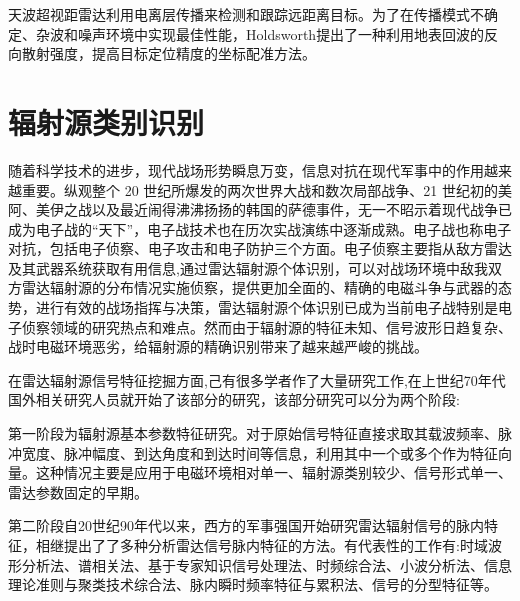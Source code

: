 天波超视距雷达利用电离层传播来检测和跟踪远距离目标。为了在传播模式不确定、杂波和噪声环境中实现最佳性能，Holdsworth\cite{holdsworth2017skywave}提出了一种利用地表回波的反向散射强度，提高目标定位精度的坐标配准方法。
\section{辐射源类别识别}
随着科学技术的进步，现代战场形势瞬息万变，信息对抗在现代军事中的作用越来越重要。纵观整个 20 世纪所爆发的两次世界大战和数次局部战争、21 世纪初的美阿、美伊之战以及最近闹得沸沸扬扬的韩国的萨德事件，无一不昭示着现代战争已成为电子战的“天下”，电子战技术也在历次实战演练中逐渐成熟。电子战也称电子对抗，包括电子侦察、电子攻击和电子防护三个方面。电子侦察主要指从敌方雷达及其武器系统获取有用信息,通过雷达辐射源个体识别，可以对战场环境中敌我双方雷达辐射源的分布情况实施侦察，提供更加全面的、精确的电磁斗争与武器的态势，进行有效的战场指挥与决策，雷达辐射源个体识别已成为当前电子战特别是电子侦察领域的研究热点和难点\cite{matuszewski2008specific}。然而由于辐射源的特征未知、信号波形日趋复杂、战时电磁环境恶劣，给辐射源的精确识别带来了越来越严峻的挑战。

在雷达辐射源信号特征挖掘方面,己有很多学者作了大量研究工作,在上世纪70年代国外相关研究人员就开始了该部分的研究\cite{therrien1974application}，该部分研究可以分为两个阶段:

第一阶段为辐射源基本参数特征研究。对于原始信号特征直接求取其载波频率、脉冲宽度、脉冲幅度、到达角度和到达时间等信息\cite{徐欣2001雷达截获系统实时信号分选处理技术研究}，利用其中一个或多个作为特征向量。这种情况主要是应用于电磁环境相对单一、辐射源类别较少、信号形式单一、雷达参数固定的早期。

第二阶段自20世纪90年代以来，西方的军事强国开始研究雷达辐射信号的脉内特征，相继提出了了多种分析雷达信号脉内特征的方法。有代表性的工作有:时域波形分析法\cite{roe1994real}、谱相关法\cite{jouny1995radar,zhang2001new}、基于专家知识信号处理法\cite{melvin2006knowledge,roe1990knowledge,capraro2006knowledge}、时频综合法\cite{rose1996emitter,chen1999joint,li2011quadratic,moraitakis2000feature}、小波分析法\cite{cohen2002importance}、信息理论准则与聚类技术综合法\cite{zhou1999combining}、脉内瞬时频率特征\cite{kawalec2004radar}与累积法\cite{aubry2011cumulants}、信号的分型特征等\cite{dudczyk2013identification,zhang2003fractal,dudczyk2013fractal}。

